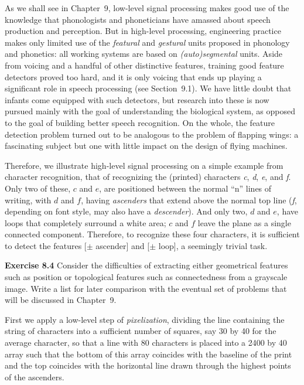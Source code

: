 As we shall see in Chapter~9, low-level signal processing makes good use of
the knowledge that phonologists and phoneticians have amassed about speech
production and perception. But in high-level processing, engineering practice
makes only limited use of the {\it featural} and {\it gestural} units proposed
in phonology and phonetics: all working systems are based on {\it
  (auto)segmental} units. Aside from voicing and a handful of other
distinctive features, training good feature detectors proved too hard, and it
is only voicing that ends up playing a significant role in speech processing
(see Section~9.1). We have little doubt that infants come equipped with such
detectors, but research into these is now pursued mainly with the goal of
understanding the biological system, as opposed to the goal of building better
speech recognition. On the whole, the feature detection problem turned out to
be analogous to the problem of flapping wings: a fascinating subject but one
with little impact on the design of flying machines.

Therefore, we illustrate high-level signal processing on a simple example from
character recognition, that of recognizing the (printed) characters {\it c},
{\it d}, {\it e}, and {\it f}. Only two of these, $c$ and $e$, are positioned
between the normal ``n'' lines of writing, with $d$ and $f$, having {\it
  ascenders} that extend above the normal top line ({\it f}, depending on font
style, may also have a {\it
  descender}). And only two,
$d$ and $e$, have loops that completely surround a white area; $c$ and $f$
leave the plane as a single connected component.  Therefore, to recognize
these four characters, it is sufficient to detect the features [$\pm$
  ascender] and [$\pm$ loop], a seemingly trivial task.

\smallskip
\noindent
{\bf Exercise 8.4} Consider the difficulties of extracting either geometrical
features such as position or topological features such as connectedness from a
grayscale image. Write a list for later comparison with the eventual set of
problems that will be discussed in Chapter~9.

\smallskip
\noindent
First we apply a low-level step of {\it pixelization}, dividing the line
containing the string of characters into a sufficient number of squares, say
30 by 40 for the average character, so that a line with 80 characters is
placed into a 2400 by 40 array such that the bottom of this array coincides
with the baseline of the print and the top coincides with the horizontal line
drawn through the highest points of the ascenders.

